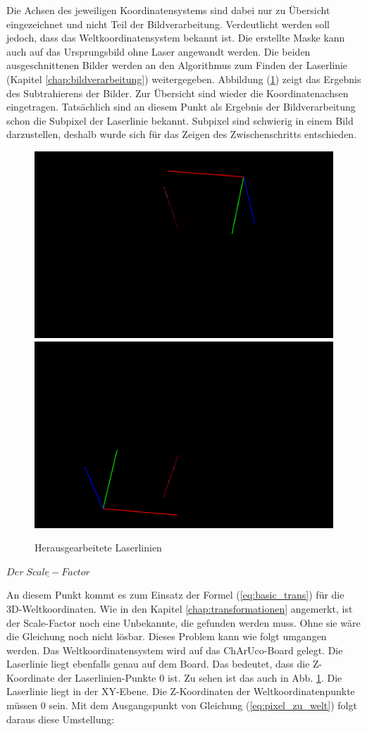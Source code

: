 		Die Achsen des jeweiligen Koordinatensystems sind dabei nur zu Übersicht eingezeichnet und nicht Teil der Bildverarbeitung. Verdeutlicht werden soll jedoch, dass das Weltkoordinatensystem bekannt ist. \newline
		Die erstellte Maske kann auch auf das Ursprungsbild ohne Laser angewandt werden. Die beiden ausgeschnittenen Bilder werden an den Algorithmus zum Finden der Laserlinie (Kapitel \ref{chap:bildverarbeitung}) weitergegeben. Abbildung (\ref{fig:ext-calib-laserlines}) zeigt das Ergebnis des Subtrahierens der Bilder. Zur Übersicht sind wieder die Koordinatenachsen eingetragen. Tatsächlich sind an diesem Punkt als Ergebnis der Bildverarbeitung schon die Subpixel der Laserlinie bekannt. Subpixel sind schwierig in einem Bild darzustellen, deshalb wurde sich für das Zeigen des Zwischenschritts entschieden.
		\newpage
		\begin{figure}[h!]
			\centering
			\includegraphics[width=0.49\linewidth]{img/hauptteil/ext-calib/laserline_primary.png}
			\includegraphics[width=0.49\linewidth]{img/hauptteil/ext-calib/laserline_secondary.png}
			\caption{Herausgearbeitete Laserlinien}
			\label{fig:ext-calib-laserlines}
		\end{figure}
	
		$\underline{Der \; Scale-Factor}$
		
		An diesem Punkt kommt es zum Einsatz der Formel (\ref{eq:basic_trans}) für die 3D-Weltkoordinaten. Wie in den Kapitel \ref{chap:transformationen} angemerkt, ist der Scale-Factor noch eine Unbekannte, die gefunden werden muss. Ohne sie wäre die Gleichung noch nicht lösbar. Dieses Problem kann wie folgt umgangen werden. Das Weltkoordinatensystem wird auf das ChArUco-Board gelegt. Die Laserlinie liegt ebenfalls genau auf dem Board. Das bedeutet, dass die Z-Koordinate der Laserlinien-Punkte 0 ist. Zu sehen ist das auch in Abb. \ref{fig:ext-calib-laserlines}. Die Laserlinie liegt in der XY-Ebene. Die Z-Koordinaten der Weltkoordinatenpunkte müssen 0 sein. Mit dem Ausgangspunkt von Gleichung (\ref{eq:pixel_zu_welt}) folgt daraus diese Umstellung:
		

